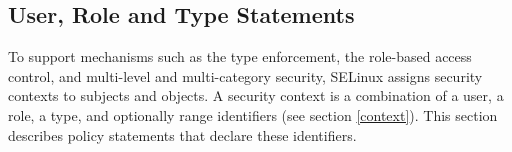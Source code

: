 
\subsection{User, Role and Type Statements}
\label{userroletype}
To support mechanisms such as the type enforcement, the role-based access
control, and multi-level and multi-category security, SELinux assigns security
contexts to subjects and objects. A security context is a combination of a user,
a role, a type, and optionally range identifiers (see section \ref{context}).
This section describes policy statements that declare these identifiers.

